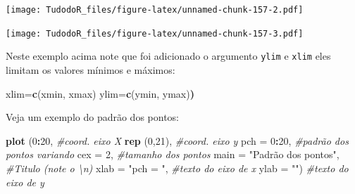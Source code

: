 \documentclass[
]{book}
\newenvironment{Shaded}{\begin{snugshade}}{\end{snugshade}}
\newcommand{\CommentTok}[1]{\textcolor[rgb]{0.56,0.35,0.01}{\textit{#1}}}
\newcommand{\DataTypeTok}[1]{\textcolor[rgb]{0.13,0.29,0.53}{#1}}
\newcommand{\DecValTok}[1]{\textcolor[rgb]{0.00,0.00,0.81}{#1}}
\newcommand{\ErrorTok}[1]{\textcolor[rgb]{0.64,0.00,0.00}{\textbf{#1}}}
\newcommand{\KeywordTok}[1]{\textcolor[rgb]{0.13,0.29,0.53}{\textbf{#1}}}
\newcommand{\NormalTok}[1]{#1}
\newcommand{\OperatorTok}[1]{\textcolor[rgb]{0.81,0.36,0.00}{\textbf{#1}}}
\newcommand{\StringTok}[1]{\textcolor[rgb]{0.31,0.60,0.02}{#1}}
\begin{document}
\begin{Shaded}
\end{Shaded}

\texttt{[image: TudodoR\_files/figure-latex/unnamed-chunk-157-2.pdf]}

\begin{Shaded}
\end{Shaded}

\texttt{[image: TudodoR\_files/figure-latex/unnamed-chunk-157-3.pdf]}

Neste exemplo acima note que foi adicionado o argumento \texttt{ylim} e \texttt{xlim} eles limitam os valores mínimos e máximos:

\begin{Shaded}
\begin{Highlighting}[]
\NormalTok{xlim=}\KeywordTok{c}\NormalTok{(xmin, xmax) ylim=}\KeywordTok{c}\NormalTok{(ymin, ymax)}\ErrorTok{)}
\end{Highlighting}
\end{Shaded}

Veja um exemplo do padrão dos pontos:

\begin{Shaded}
\begin{Highlighting}[]
\KeywordTok{plot}\NormalTok{ (}\DecValTok{0}\OperatorTok{:}\DecValTok{20}\NormalTok{,                         }\CommentTok{#coord. eixo X}
      \KeywordTok{rep}\NormalTok{ (}\DecValTok{0}\NormalTok{,}\DecValTok{21}\NormalTok{),                   }\CommentTok{#coord. eixo y}
      \DataTypeTok{pch =} \DecValTok{0}\OperatorTok{:}\DecValTok{20}\NormalTok{,                   }\CommentTok{#padrão dos pontos variando}
      \DataTypeTok{cex =} \DecValTok{2}\NormalTok{,                      }\CommentTok{#tamanho dos pontos}
      \DataTypeTok{main =} \StringTok{"Padrão dos pontos"}\NormalTok{, }\CommentTok{#Titulo (note o \textbackslash{}n)}
      \DataTypeTok{xlab =} \StringTok{"pch = "}\NormalTok{,              }\CommentTok{#texto do eixo de x}
      \DataTypeTok{ylab =} \StringTok{""}\NormalTok{)                    }\CommentTok{#texto do eixo de y}
\end{Highlighting}
\end{Shaded}
\end{document}
